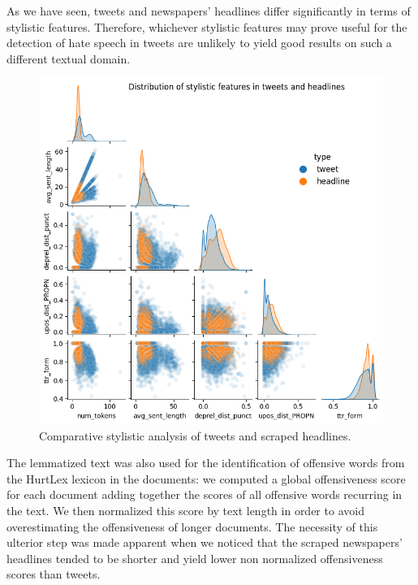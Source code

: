 As we have seen, tweets and newspapers' headlines differ significantly in terms of stylistic features.
Therefore, whichever stylistic features may prove useful for the detection of hate speech in tweets are unlikely to yield good results on such a different textual domain.

\begin{figure}
    \includegraphics[width=\columnwidth]{../../results/images/style.png}
    \caption{Comparat{}ive stylistic analysis of tweets and scraped headlines.}
    \label{fig:style}
\end{figure}

The lemmatized text was also used for the identification of offensive words from the HurtLex lexicon in the documents: we computed a global offensiveness score for each document adding together the scores of all offensive words recurring in the text.
We then normalized this score by text length in order to avoid overestimating the offensiveness of longer documents.
The necessity of this ulterior step was made apparent when we noticed that the scraped newspapers' headlines tended to be shorter and yield lower non normalized offensiveness scores than tweets.